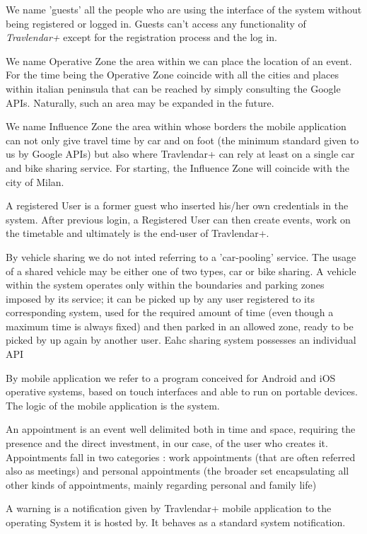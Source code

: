 \begin{description}
				\item[Guest] We name 'guests' all the people who are using the interface of the system without being registered or logged in. Guests can't access any functionality of \textit{Travlendar+} except for the registration process and the log in. 
				\item[Operative Zone] We name Operative Zone the area within we can place the location of an event. For the time being the Operative Zone coincide with all the cities and places within italian peninsula that can be reached by simply consulting the Google APIs. Naturally, such an area may be expanded in the future.
				\item[Influence Zone] We name Influence Zone the area within whose borders the mobile application can not only give travel time by car and on foot (the minimum standard given to us by Google APIs) but also where Travlendar+ can rely at least on a single car and bike sharing service. For starting, the Influence Zone will coincide with the city of Milan.
				\item
				\item[Registered User] A registered User is a former guest who inserted his/her own credentials in the system. After previous login, a Registered User can then create events, work on the timetable and ultimately is the end-user of Travlendar+.
				\item[Timetable]
				\item[Vehicle Sharing System and a Shared Vehicle] By vehicle sharing we do not inted referring to a 'car-pooling' service. The usage of a shared vehicle may be either one of two types, car or bike sharing. A vehicle within the system operates only within the boundaries and parking zones imposed by its service; it can be picked up by any user registered to its corresponding system, used for the required amount of time (even though a maximum time is always fixed) and then parked in an allowed zone, ready to be picked by up again by another user. Eahc sharing system possesses an individual API			
				\item[Mobile Application] By mobile application we refer to a program conceived for Android and iOS operative systems, based on touch interfaces and able to run on portable devices. The logic of the mobile application is the system.
				\item[Appointment] An appointment is an event well delimited both in time and space, requiring the presence and the direct investment, in our case, of the user who creates it. Appointments fall in two categories : work appointments (that are often referred also as meetings) and personal appointments (the broader set encapsulating all other kinds of appointments, mainly regarding personal and family life)
				\item[Warning] A warning is a notification given by Travlendar+ mobile application to the operating System it is hosted by. It behaves as a standard system notification.
\end{description}
